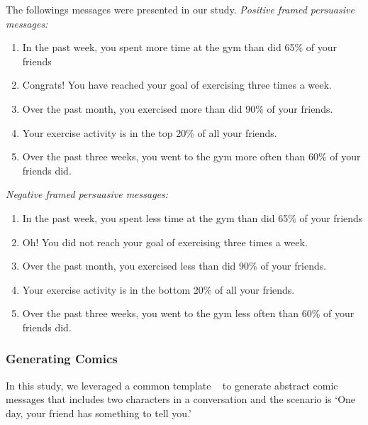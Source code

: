The followings messages were presented in our study.
\textit{Positive framed persuasive messages:}
\begin{enumerate}
 \item In the past week, you spent more time at the gym than did 65\% of your friends
 \item Congrats! You have reached your goal of exercising three times a week.
 \item Over the past month, you exercised more than did 90\% of your friends.
 \item Your exercise activity is in the top 20\% of all your friends.
 \item Over the past three weeks, you went to the gym more often than 60\% of your friends did.
\end{enumerate}\par
\textit{Negative framed persuasive messages:}
\begin{enumerate}
 \item	In the past week, you spent less time at the gym than did 65\% of your friends
 \item  Oh! You did not reach your goal of exercising three times a week.
 \item	Over the past month, you exercised less than did 90\% of your friends.
 \item	Your exercise activity is in the bottom 20\% of all your friends.
 \item	Over the past three weeks, you went to the gym less often than 60\% of your friends did.
\end{enumerate}

\subsubsection{Generating Comics}
In this study, we leveraged a common template ~\cite{cmx.io, munroe2009xkcd} to generate abstract comic messages that includes two characters in a conversation and the scenario is `One day, your friend has something to tell you.'

